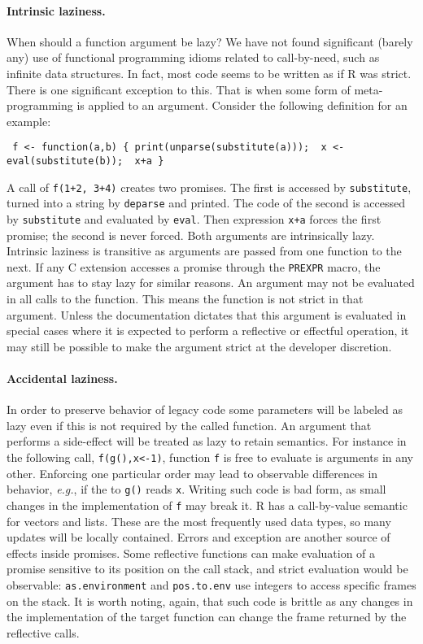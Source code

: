 \documentclass[review,nonacm,screen,acmsmall,anonymous=true]{acmart}
\newcommand{\code}[1]{\lstinline |#1|\xspace}
\renewcommand{\c}[1]{\lstinline |#1|\xspace}
\newcommand{\eg}{\emph{e.g.},\xspace}
\begin{document}
\paragraph{Intrinsic laziness.} When should a function argument be lazy?
We have not found significant (barely any) use of functional programming idioms
related to call-by-need, such as infinite data structures. In fact, most code
seems to be written as if R was strict. There is one significant exception to
this. That is when some form of meta-programming is applied to an argument.
Consider the following definition for an example:
\begin{lstlisting}
 f <- function(a,b) { print(unparse(substitute(a)));  x <- eval(substitute(b));  x+a }
\end{lstlisting}

\medskip
\noindent
A call of \c{f(1+2, 3+4)} creates two promises. The first is accessed by
\c{substitute}, turned into a string by \c{deparse} and printed. The code of the
second is accessed by \c{substitute} and evaluated by \c{eval}. Then expression
\c{x+a} forces the first promise; the second is never forced. Both arguments are
intrinsically lazy. Intrinsic laziness is transitive as arguments are passed
from one function to the next. If any C extension accesses a promise through the
\code{PREXPR} macro, the argument has to stay lazy for similar reasons. An
argument may not be evaluated in all calls to the function. This means the
function is not strict in that argument. Unless the documentation dictates that
this argument is evaluated in special cases where it is expected to perform a
reflective or effectful operation, it may still be possible to make the argument
strict at the developer discretion.

\paragraph{Accidental laziness.} In order to preserve behavior of legacy code
some parameters will be labeled as lazy even if this is not required by the
called function. An argument that performs a side-effect will be treated as lazy
to retain semantics. For instance in the following call, \c{f(g(),x<-1)},
function \c f is free to evaluate is arguments in any other. Enforcing one
particular order may lead to observable differences in behavior, \eg if the to
\c{g()} reads \c{x}. Writing such code is bad form, as small changes in the
implementation of \c f may break it. R has a call-by-value semantic for vectors
and lists. These are the most frequently used data types, so many updates will
be locally contained. Errors and exception are another source of effects inside
promises. Some reflective functions can make evaluation of a promise sensitive to
its position on the call stack, and strict evaluation would be observable:
\code{as.environment} and \code{pos.to.env} use integers to access specific
frames on the stack. It is worth noting, again, that such code is brittle as any
changes in the implementation of the target function can change the frame
returned by the reflective calls.
\end{document}
